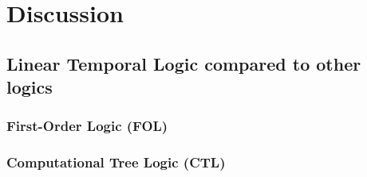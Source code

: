 \section{Discussion}\label{sec:discussion}
\subsection{Linear Temporal Logic compared to other logics}
\subsubsection{First-Order Logic (FOL)}
\subsubsection{Computational Tree Logic (CTL)}